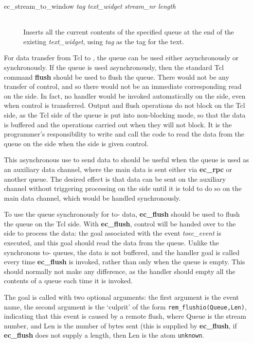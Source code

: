 \begin{description}
\item[ec_stream_to_window {\it tag text_widget stream_nr length}]\ \\
        Inserts all the current contents of the specified queue 
        at the end of the existing {\it text_widget}, using {\it tag} as
        the tag for the text. 

\end{description}


For data transfer from Tcl to {\eclipse}, 
the queue can be used either asynchronously or synchronously. 
If the
queue is used asynchronously, then the standard Tcl command {\bf flush}
should be used to flush the queue. There would not be any transfer of
control, and so there would not be an
immediate corresponding read on the {\eclipse} side. In fact, no handler
would be invoked automatically on the {\eclipse} side, even when control is
transferred. 
Output and flush
operations do not block on the Tcl side, as the Tcl side of the queue is
put into non-blocking mode, so that the data is buffered and the operations
carried out when they will not block. It is the programmer's responsibility
to write and call the code to read the data from the queue on the {\eclipse} side when
the {\eclipse} side is given control.

This asynchronous use to send data to {\eclipse} should be useful when
the queue is used as an auxiliary data
channel, where the main data is sent either via {\bf ec_rpc} or another
queue. The desired effect is that data can be sent on the auxiliary channel
without triggering processing on the {\eclipse} side until it is told to do
so on the main data channel, which would be handled synchronously. 

To use the queue synchronously for
to-{\eclipse} data, {\bf ec_flush} should be used to flush the queue on the
Tcl side. 
With {\bf ec_flush}, control will be handed over to the
{\eclipse} side to process the data: the goal associated with the event {\it toec_event} is
executed, and this goal should read the data from the queue. 
Unlike the synchronous to-{\eclipse}
queues, the data is not buffered, and the handler goal is called every time
{\bf ec_flush} is invoked, rather than only when the queue is empty. This
should normally not make any difference, as the handler should empty all
the contents of a queue each time it is invoked.

The goal is called with two optional arguments: the first argument is the
event name, the second argument is the `culprit' of the form
\verb'rem_flushio(Queue,Len)', indicating that this event is caused by a
remote flush, where Queue is the {\eclipse} stream number,
and Len is the number of bytes sent (this is supplied by {\bf ec_flush}, if
{\bf ec_flush} does not supply a length, then Len is the atom
\verb'unknown'.

